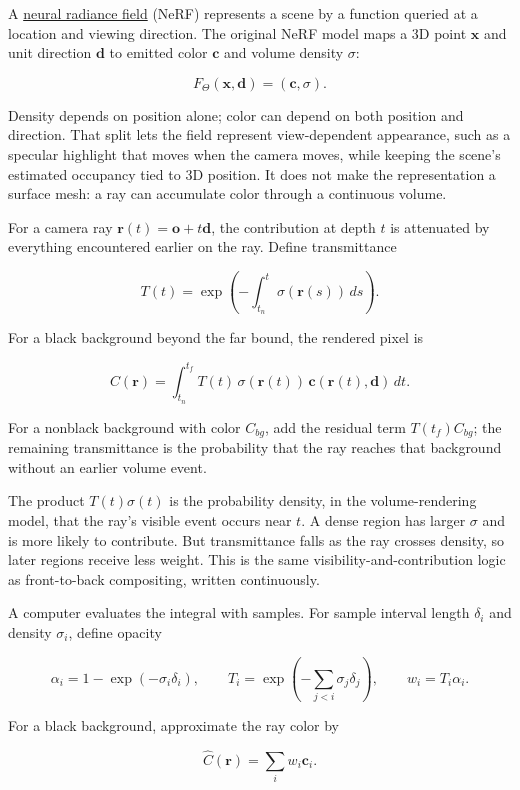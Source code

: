 A \hyperref[appendix-c5b332e400e7]{neural radiance field} (NeRF) represents a scene by a function queried at a location and viewing direction. The original NeRF model maps a 3D point \(\mathbf{x}\) and unit direction \(\mathbf{d}\) to emitted color \(\mathbf{c}\) and volume density \(\sigma\):

\[F_\Theta(\mathbf{x},\mathbf{d})=(\mathbf{c},\sigma).\]

Density depends on position alone; color can depend on both position and direction. That split lets the field represent view-dependent appearance, such as a specular highlight that moves when the camera moves, while keeping the scene's estimated occupancy tied to 3D position. It does not make the representation a surface mesh: a ray can accumulate color through a continuous volume.

For a camera ray \(\mathbf{r}(t)=\mathbf{o}+t\mathbf{d}\), the contribution at depth \(t\) is attenuated by everything encountered earlier on the ray. Define transmittance

\[T(t)=\exp\left(-\int_{t_n}^{t}\sigma(\mathbf{r}(s))\,ds\right).\]

For a black background beyond the far bound, the rendered pixel is

\[C(\mathbf{r})=\int_{t_n}^{t_f}T(t)\,\sigma(\mathbf{r}(t))\,\mathbf{c}(\mathbf{r}(t),\mathbf{d})\,dt.\]

For a nonblack background with color \(C_{bg}\), add the residual term \(T(t_f)C_{bg}\); the remaining transmittance is the probability that the ray reaches that background without an earlier volume event.

The product \(T(t)\sigma(t)\) is the probability density, in the volume-rendering model, that the ray's visible event occurs near \(t\). A dense region has larger \(\sigma\) and is more likely to contribute. But transmittance falls as the ray crosses density, so later regions receive less weight. This is the same visibility-and-contribution logic as front-to-back compositing, written continuously.

A computer evaluates the integral with samples. For sample interval length \(\delta_i\) and density \(\sigma_i\), define opacity

\[\alpha_i=1-\exp(-\sigma_i\delta_i),\qquad T_i=\exp\left(-\sum_{j<i}\sigma_j\delta_j\right),\qquad w_i=T_i\alpha_i.\]

For a black background, approximate the ray color by

\[\widehat C(\mathbf{r})=\sum_i w_i\mathbf{c}_i.\]


